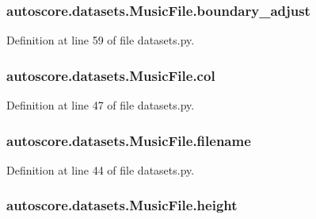 \subsubsection[{\texorpdfstring{boundary\+\_\+adjust}{boundary_adjust}}]{\setlength{\rightskip}{0pt plus 5cm}autoscore.\+datasets.\+Music\+File.\+boundary\+\_\+adjust}\hypertarget{classautoscore_1_1datasets_1_1MusicFile_afe8a162e3c25071506d522dcd570a0be}{}\label{classautoscore_1_1datasets_1_1MusicFile_afe8a162e3c25071506d522dcd570a0be}


Definition at line 59 of file datasets.\+py.

\subsubsection[{\texorpdfstring{col}{col}}]{\setlength{\rightskip}{0pt plus 5cm}autoscore.\+datasets.\+Music\+File.\+col}\hypertarget{classautoscore_1_1datasets_1_1MusicFile_a3fab23d7e20ab614e18c8d8b12e0fd57}{}\label{classautoscore_1_1datasets_1_1MusicFile_a3fab23d7e20ab614e18c8d8b12e0fd57}


Definition at line 47 of file datasets.\+py.

\subsubsection[{\texorpdfstring{filename}{filename}}]{\setlength{\rightskip}{0pt plus 5cm}autoscore.\+datasets.\+Music\+File.\+filename}\hypertarget{classautoscore_1_1datasets_1_1MusicFile_aacc6dc64cbc5fe1e92c6a06edc989afb}{}\label{classautoscore_1_1datasets_1_1MusicFile_aacc6dc64cbc5fe1e92c6a06edc989afb}


Definition at line 44 of file datasets.\+py.

\subsubsection[{\texorpdfstring{height}{height}}]{\setlength{\rightskip}{0pt plus 5cm}autoscore.\+datasets.\+Music\+File.\+height}\hypertarget{classautoscore_1_1datasets_1_1MusicFile_a9f6580afdca3397f15fe0e60b48a75cc}{}\label{classautoscore_1_1datasets_1_1MusicFile_a9f6580afdca3397f15fe0e60b48a75cc}



